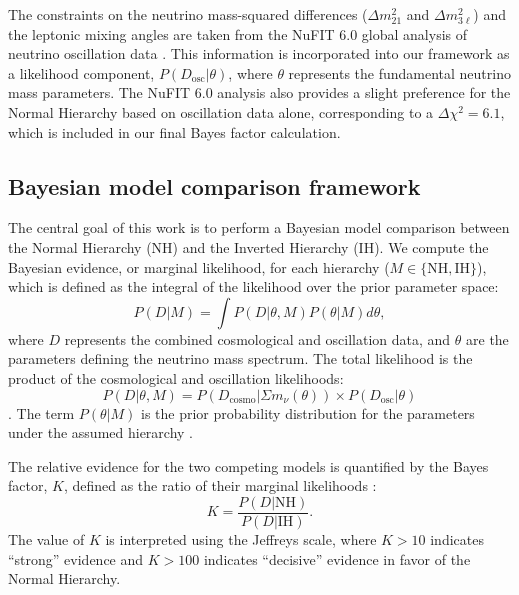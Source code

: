 \documentclass[]{article}
\begin{document}
The constraints on the neutrino mass-squared differences ($\Delta m^2_{21}$ and $\Delta m^2_{3\ell}$) and the leptonic mixing angles are taken from the NuFIT 6.0 global analysis of neutrino oscillation data \citep{alikhanov2026relationneutrinomasssquareddifferences}. This information is incorporated into our framework as a likelihood component, $P(D_{\text{osc}}|\theta)$, where $\theta$ represents the fundamental neutrino mass parameters. The NuFIT 6.0 analysis also provides a slight preference for the Normal Hierarchy based on oscillation data alone, corresponding to a $\Delta\chi^2 = 6.1$, which is included in our final Bayes factor calculation.

\subsection{Bayesian model comparison framework}
The central goal of this work is to perform a Bayesian model comparison \citep{thorngren2025bayesianmodelcomparisonsignificance} between the Normal Hierarchy (NH) and the Inverted Hierarchy (IH). We compute the Bayesian evidence, or marginal likelihood, for each hierarchy ($M \in \{\text{NH}, \text{IH}\}$), which is defined as the integral of the likelihood over the prior parameter space:
\begin{equation}P(D|M) = \int P(D|\theta, M) P(\theta|M) d\theta,\end{equation}
where $D$ represents the combined cosmological and oscillation data, and $\theta$ are the parameters defining the neutrino mass spectrum. The total likelihood is the product of the cosmological and oscillation likelihoods:
\[P(D|\theta, M) = P(D_{\text{cosmo}}|\Sigma m_\nu(\theta)) \times P(D_{\text{osc}}|\theta)\]
\citep{giusarma2012testingstandardnonstandardneutrino,barua2026cosmologicalconstraintsneutrinomasses}. The term $P(\theta|M)$ is the prior probability distribution for the parameters under the assumed hierarchy \citep{barua2026cosmologicalconstraintsneutrinomasses}.

The relative evidence for the two competing models is quantified by the Bayes factor, $K$, defined as the ratio of their marginal likelihoods \citep{chib2016bayesfactorconsistency,mattei2020parsimonioustourbayesianmodel,kim2024deepbayesfactors}:
\begin{equation}K = \frac{P(D|\text{NH})}{P(D|\text{IH})}.\end{equation}
The value of $K$ is interpreted using the Jeffreys scale, where $K > 10$ indicates ``strong'' evidence and $K > 100$ indicates ``decisive'' evidence in favor of the Normal Hierarchy. \citep{dudbridge2024scaleinterpretationlikelihoodratios}
\end{document}
